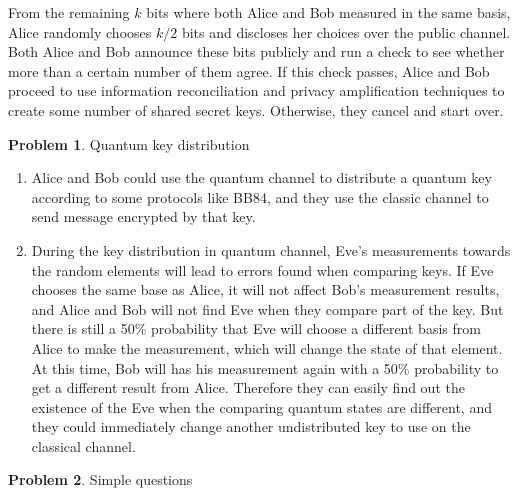 \documentclass[12pt]{article}
\theoremstyle{definition}
\newtheorem{problem}{Problem}
\begin{document}
From the remaining $k$ bits where both Alice and Bob measured in the same basis, Alice randomly chooses $k/2$ bits and discloses her choices over the public channel. Both Alice and Bob announce these bits publicly and run a check to see whether more than a certain number of them agree. If this check passes, Alice and Bob proceed to use information reconciliation and privacy amplification techniques to create some number of shared secret keys. Otherwise, they cancel and start over.

\begin{problem}
Quantum key distribution
\end{problem}
\begin{enumerate}
    \item
Alice and Bob could use the quantum channel to distribute a quantum key according to some protocols like BB84, and they use the classic channel to send message encrypted by that key.
\item
During the key distribution in quantum channel, Eve's measurements towards the random elements will lead to errors found when comparing keys. If Eve chooses the same base as Alice, it will not affect Bob's measurement results, and Alice and Bob will not find Eve when they compare part of the key. But there is still a 50\% probability that Eve will choose a different basis from Alice to make the measurement, which will change the state of that element. At this time, Bob will has his measurement again with a 50\% probability to get a different result from Alice. Therefore they can easily find out the existence of the Eve when the comparing quantum states are different, and they could immediately change another undistributed key to use on the classical channel.

\end{enumerate}
\begin{problem}
Simple questions
\end{problem}
\end{document}
